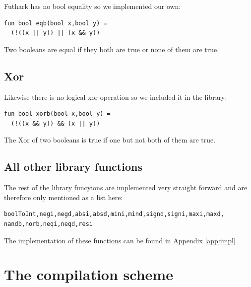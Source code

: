 \documentclass[11pt]{article}
\begin{document}
Futhark has no bool equality so we implemented our own:

\begin{lstlisting}[language=Futhark]
fun bool eqb(bool x,bool y) =
  (!((x || y)) || (x && y))
\end{lstlisting}

Two booleans are equal if they both are true or none of them are true.

\subsection{Xor} Likewise there is no logical xor operation so we included it in the library:

\begin{lstlisting}[language=Futhark]
fun bool xorb(bool x,bool y) =
  (!((x && y)) && (x || y))
\end{lstlisting}

The Xor of two booleans is true if one but not both of them are true.

\subsection{All other library functions}
The rest of the library funcyions are implemented very straight forward and are therefore only mentioned as a list here:

\begin{lstlisting}[numbers=none,frame=none]
boolToInt,negi,negd,absi,absd,mini,mind,signd,signi,maxi,maxd,
nandb,norb,neqi,neqd,resi
\end{lstlisting}
The implementation of these functions can be found in Appendix \ref{app:impl}

\section{The compilation scheme}
\label{sec:scheme}
\end{document}
